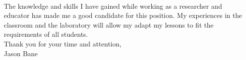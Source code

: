 \documentclass[12pt,letterpaper]{article}
\begin{document}
\paragraph{}The knowledge and skills I have gained while working as a researcher and educator has made me a good candidate for this position. My experiences in the classroom and the laboratory will allow my adapt my lessons to fit the requirements of all students. 
\\

\noindent Thank you for your time and attention,\\
\noindent Jason Bane
\end{document}

